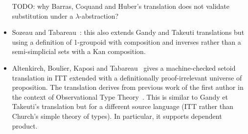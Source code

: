 \documentclass{article}
\begin{document}
\begin{itemize}
  TODO: why Barras, Coquand and Huber's translation does not validate
  substitution under a $\lambda$-abstraction?

\item Sozeau and Tabareau~\cite{SozeauTabareau14}: this also extends
  Gandy and Takeuti translations but using a definition of 1-groupoid
  with composition and inverses rather than a semi-simplicial sets
  with a Kan composition.

\item Altenkirch, Boulier, Kaposi and
  Tabareau~\cite{AltenkirchBoulierKaposiTabareau19} gives a
  machine-checked setoid translation in ITT extended with a
  definitionally proof-irrelevant universe of proposition. The
  translation derives from previous work of the first author in the
  context of Observational Type Theory~\cite{}. This is similar to
  Gandy et Takeuti's translation but for a different source language
  (ITT rather than Church's simple theory of types). In particular, it
  supports dependent product.
\end{itemize}
\end{document}
